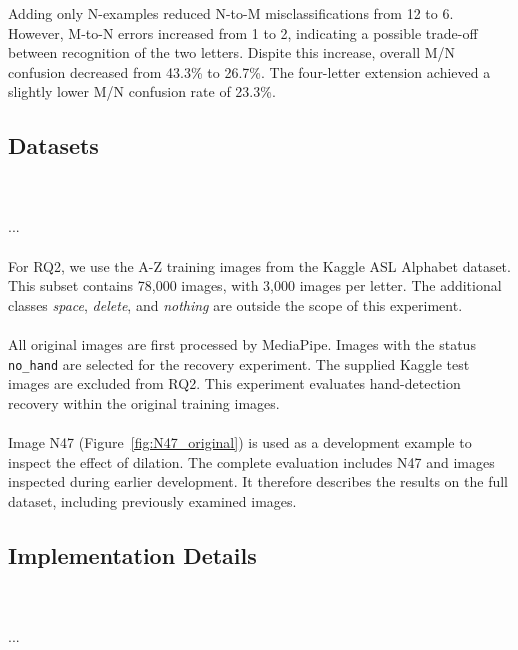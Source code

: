 \documentclass{article}
\begin{document}
Adding only N-examples reduced N-to-M misclassifications from 12 to 6. However, M-to-N errors increased from 1 to 2, indicating a possible trade-off between recognition of the two letters. Dispite this increase, overall M/N confusion decreased from 43.3\% to 26.7\%. The four-letter extension achieved a slightly lower M/N confusion rate of 23.3\%.
    \subsection{Datasets}

\leavevmode 
        \\\\
        ...
        \\\\
        
        For RQ2, we use the A-Z training images from the Kaggle ASL Alphabet dataset. This subset contains 78,000 images, with 3,000 images per letter. The additional classes \textit{space}, \textit{delete}, and \textit{nothing} are outside the scope of this experiment.
        \\\\
        All original images are first processed by MediaPipe. Images with the status \texttt{no\_hand} are selected for the recovery experiment. The supplied Kaggle test images are excluded from RQ2. This experiment evaluates hand-detection recovery within the original training images.
        \\\\
        Image N47 (Figure~\ref{fig:N47_original}) is used as a development example to inspect the effect of dilation. The complete evaluation includes N47 and images inspected during earlier development. It therefore describes the results on the full dataset, including previously examined images.
        
    \subsection{Implementation Details}

\leavevmode 
        \\\\
        ...
        \\\\
        
\end{document}
